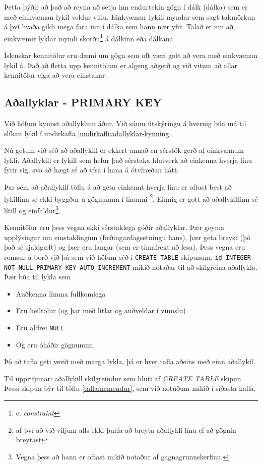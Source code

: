 Þetta þýðir að það að reyna að setja inn endurtekin gögn í dálk (dálka) sem er með einkvæman lykil veldur villu. Einkvæmur lykill myndar sem sagt takmörkun á því hvaða gildi mega fara inn í dálka sem hann nær yfir. Talað er um að einkvæmir lyklar myndi skorðu\footnote{e. \emph{constraint}} á dálkinn eða dálkana.

Íslenskar kennitölur eru dæmi um gögn sem oft væri gott að vera með einkvæman lykil á. Það að fletta upp kennitölum er algeng aðgerð og við vitum að allar kennitölur eiga að vera einstakar.
\subsection{Aðallyklar - PRIMARY KEY}
\label{undirkafli:adallyklar}
Við höfum kynnst aðallyklum áður. Við sáum útskýringu á hvernig búa má til slíkan lykil í undirkafla \ref{undirkafli:adallyklar-kynning}.

Nú getum við séð að aðallykill er ekkert annað en sérstök gerð af einkvæmum lykli. Aðallykill er lykill sem hefur það sérstaka hlutverk að einkenna hverja línu fyrir sig, svo að hægt sé að vísa í hana á ótvíræðan hátt.

Þar sem að aðallykill töflu á að geta einkennt hverja línu er oftast best að lykillinn sé ekki byggður á gögnunum í línunni \footnote{af því að við viljum alls ekki þurfa að breyta aðallykli línu ef að gögnin breytast}. Einnig er gott að aðallykillinn sé lítill og einfaldur\footnote{Vegna þess að hann er oftast mikið notaður af gagnagrunnskerfinu.}. 

Kennitölur eru þess vegna ekki sérstaklega góðir aðallyklar. Þær geyma upplýsingar um einstaklinginn (fæðingardagsetningu hans), þær geta breyst (þó það sé sjaldgæft) og þær eru langar (sem er tímafrekt að lesa). Þess vegna eru romsur á borð við þá sem við höfum séð í \verb|CREATE TABLE| skipunum, \verb|id INTEGER NOT NULL PRIMARY KEY AUTO_INCREMENT| mikið notaðar til að skilgreina aðallykla. Þær búa til lykla sem 
\begin{itemize}
 \item Auðkenna línuna fullkomlega
 \item Eru heiltölur (og þar með litlar og auðveldar í vinnslu)
 \item Eru aldrei \verb|NULL|
 \item Og eru óháðir gögnunum.
\end{itemize}
Þó að tafla geti verið með marga lykla, þá er hver tafla aðeins með einn aðallykil.

\begin{example}
\caption[PRIMARY KEY]{Til upprifjunar: aðallykill skilgreindur sem hluti af \emph{CREATE TABLE} skipun. Þessi skipun býr til töflu \ref{tafla:nemendur}, sem við notuðum mikið í síðasta kafla.}
\label{sql:k5d1-primary-key}
\centering
{}
\end{example}
